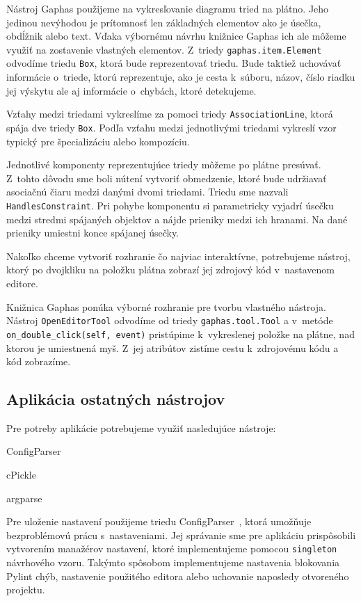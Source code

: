 \documentclass[11pt,oneside,final]{fithesis2}
\begin{document}
		Nástroj Gaphas použijeme na vykresľovanie diagramu tried na plátno. Jeho jedinou nevýhodou je prítomnosť len základných elementov ako je úsečka, obdĺžnik alebo text. Vďaka výbornému návrhu knižnice Gaphas ich ale môžeme využiť na zostavenie vlastných elementov. Z~triedy \texttt{gaphas.item.Element} odvodíme triedu \texttt{Box}, ktorá bude reprezentovať triedu. Bude taktiež uchovávať informácie o~triede, ktorú reprezentuje, ako je cesta k~súboru, názov, číslo riadku jej výskytu ale aj informácie o~chybách, ktoré detekujeme.
		
		Vzťahy medzi triedami vykreslíme za pomoci triedy \texttt{AssociationLine}, ktorá spája dve triedy \texttt{Box}. Podľa vzťahu medzi jednotlivými triedami vykreslí vzor typický pre špecializáciu alebo kompozíciu.
		
		Jednotlivé komponenty reprezentujúce triedy môžeme po plátne presúvať. Z~tohto dôvodu sme boli nútení vytvoriť obmedzenie, ktoré bude udržiavať asociačnú čiaru medzi danými dvomi triedami. Triedu sme nazvali \texttt{HandlesConstraint}. Pri pohybe komponentu si parametricky vyjadrí úsečku medzi stredmi spájaných objektov a nájde prieniky medzi ich hranami. Na dané prieniky umiestni konce spájanej úsečky.
		
		Nakoľko chceme vytvoriť rozhranie čo najviac interaktívne, potrebujeme nástroj, ktorý po dvojkliku na položku plátna zobrazí jej zdrojový kód v~nastavenom editore.
		
		Knižnica Gaphas ponúka výborné rozhranie pre tvorbu vlastného nástroja. Nástroj \texttt{OpenEditorTool} odvodíme od triedy \texttt{gaphas.tool.Tool} a v~metóde \texttt{on\_double\_click(self, event)} pristúpime k~vykreslenej položke na plátne, nad ktorou je umiestnená myš. Z~jej atribútov zistíme cestu k~zdrojovému kódu a kód zobrazíme.

		\subsection{Aplikácia ostatných nástrojov}
		
	Pre potreby aplikácie potrebujeme využiť nasledujúce nástroje:
	
				\begin{list}{•}{}
					\item ConfigParser
					\item cPickle
					\item argparse
    			\end{list}
	
	 Pre uloženie nastavení použijeme triedu ConfigParser~\cite{configparser}, ktorá umožňuje bezproblémovú prácu s~nastaveniami. Jej správanie sme pre aplikáciu prispôsobili vytvorením manažérov nastavení, ktoré implementujeme pomocou \texttt{singleton} návrhového vzoru. Takýmto spôsobom implementujeme nastavenia blokovania Pylint chýb, nastavenie použitého editora alebo uchovanie naposledy otvoreného projektu.
	
\end{document}
